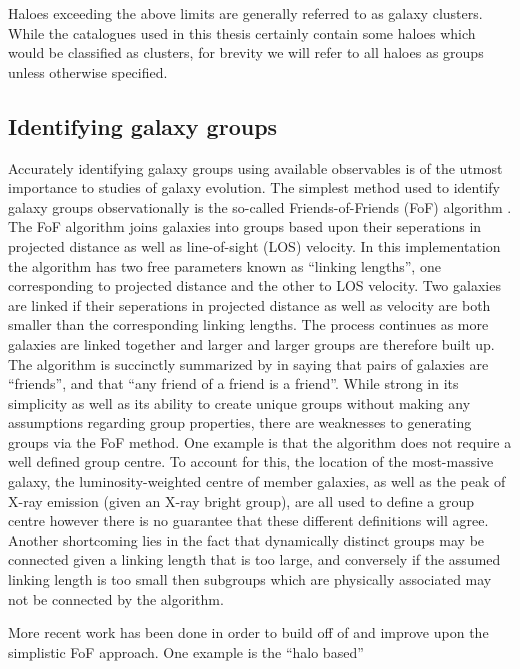 \noindent
Haloes exceeding the above limits are generally referred to as galaxy
clusters.  While the catalogues used in this thesis certainly
contain some haloes which would be classified as clusters, for brevity
we will refer to all haloes as groups unless otherwise specified.

\subsection{Identifying galaxy groups}
\label{sec:identify_groups}

Accurately identifying galaxy groups using available observables is of
the utmost importance to studies of galaxy evolution.  The simplest
method used to identify galaxy groups observationally is the
so-called Friends-of-Friends (FoF) algorithm
\citep[e.g.][]{huchra1982, press1982}.  The FoF
algorithm joins galaxies into
groups based upon their seperations in projected distance as well as
line-of-sight (LOS) velocity.  In this implementation the algorithm
has two
free parameters known as ``linking lengths'', one corresponding to
projected distance and the other to LOS velocity.  Two galaxies are
linked if their seperations in projected distance as well as velocity
are both smaller than the corresponding linking lengths.  The process
continues as more galaxies are linked together and larger and larger
groups are therefore built up.  The algorithm is succinctly summarized
by \citet{press1982} in saying that pairs of galaxies are
``friends'', and that ``any friend of a friend is a friend''.  While
strong in its simplicity as well as its ability to create unique
groups without making any assumptions regarding group properties,
there are weaknesses to generating groups via the FoF method.  One
example is that the algorithm does not require a well defined group
centre.  To account for this, the location of the most-massive galaxy,
the luminosity-weighted centre of member galaxies, as well as the peak
of X-ray emission (given an X-ray bright group), are all used to
define a group centre however there is no guarantee that these
different definitions will agree.  Another shortcoming lies in the
fact that dynamically distinct groups may be connected given a linking
length that is too large, and conversely if the assumed linking length
is too small then subgroups which are physically associated may not be
connected by the algorithm.
\par
More recent work has been done in order to build off of and improve
upon the simplistic FoF approach.  One example is the ``halo based''
